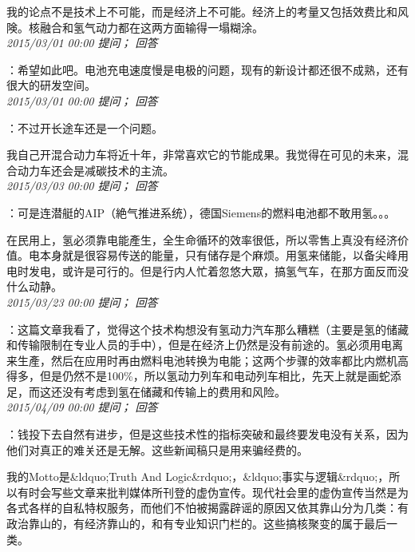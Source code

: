 \documentclass[twocolumn]{ctexart}
\begin{document}
我的论点不是技术上不可能，而是经济上不可能。经济上的考量又包括效费比和风険。核融合和氢气动力都在这两方面输得一塌糊涂。\\

\textit{\hfill\noindent\small 2015/03/01 00:00 提问； 回答}

：希望如此吧。电池充电速度慢是电极的问题，现有的新设计都还很不成熟，还有很大的研发空间。\\

\textit{\hfill\noindent\small 2015/03/01 00:00 提问； 回答}

：不过开长途车还是一个问题。

我自己开混合动力车将近十年，非常喜欢它的节能成果。我觉得在可见的未来，混合动力车还会是减碳技术的主流。\\

\textit{\hfill\noindent\small 2015/03/03 00:00 提问； 回答}

：可是连潜艇的AIP（絶气推进系统），德国Siemens的燃料电池都不敢用氢。。。

在民用上，氢必须靠电能產生，全生命循环的效率很低，所以零售上真没有经济价值。电本身就是很容易传送的能量，只有储存是个麻烦。用氢来储能，以备尖峰用电时发电，或许是可行的。但是行内人忙着忽悠大眾，搞氢气车，在那方面反而没什么动静。\\

\textit{\hfill\noindent\small 2015/03/23 00:00 提问； 回答}

：这篇文章我看了，觉得这个技术构想没有氢动力汽车那么糟糕（主要是氢的储藏和传输限制在专业人员的手中），但是在经济上仍然是没有前途的。氢必须用电离来生產，然后在应用时再由燃料电池转换为电能；这两个步骤的效率都比内燃机高得多，但是仍然不是100\%，所以氢动力列车和电动列车相比，先天上就是画蛇添足，而这还没有考虑到氢在储藏和传输上的费用和风险。\\

\textit{\hfill\noindent\small 2015/04/09 00:00 提问； 回答}

：钱投下去自然有进步，但是这些技术性的指标突破和最终要发电没有关系，因为他们对真正的难关还是无解。这些新闻稿只是用来骗经费的。

我的Motto是\&ldquo;Truth And Logic\&rdquo;，\&ldquo;事实与逻辑\&rdquo;，所以有时会写些文章来批判媒体所刊登的虚伪宣传。现代社会里的虚伪宣传当然是为各式各样的自私特权服务，而他们不怕被揭露辟谣的原因又依其靠山分为几类：有政治靠山的，有经济靠山的，和有专业知识门栏的。这些搞核聚变的属于最后一类。\\
\end{document}
